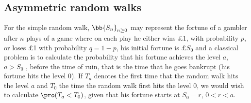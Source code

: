 \subsection{Asymmetric random walks}

\begin{example}\label{exa:randam_walk_simple}
For the simple random walk, $\bb{S_n}_{n\geq 0}$ may represent the fortune of a gambler after $n$ plays of a game where on each play he either wins \pounds 1, with probability $p$, or loses \pounds 1 with probability $q =
1-p$, his initial fortune is \pounds $S_0$ and a classical problem is to calculate the probability that his fortune achieves the level $a$, $a > S_0$ , before the time of ruin, that is the time that he goes bankrupt (his
fortune hits the level 0). If $T_a$ denotes the first time that the random walk hits the level $a$ and $T_0$ the time the random walk first hits the level 0, we would wish to calculate $\pro (T_a < T_0)$, given that his
fortune starts at $S_0 = r$, $0 < r < a$.

\end{example}
